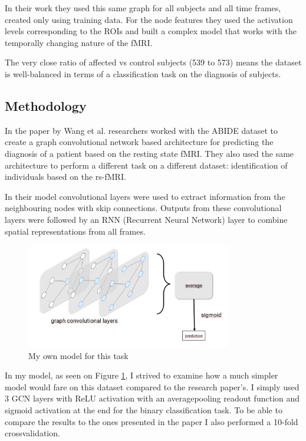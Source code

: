 	In their work they used this same graph for all subjects and all time frames, created only using training data. For the node features they used the activation levels corresponding to the ROIs and built a complex model that works with the temporally changing nature of the fMRI. 
	
	
	The very close ratio of affected vs control subjects (539 to 573) means the dataset is well-balanced in terms of a classification task on the diagnosis of subjects. 
	
	\subsection{Methodology}
	In the paper \cite{wang2021graph} by Wang et al. researchers worked with the ABIDE dataset to create a graph convolutional network based architecture for predicting the diagnosis of a patient based on the resting state fMRI. They also used the same architecture to perform a different task on a different dataset: identification of individuals based on the rs-fMRI.
	
	
	 In their model convolutional layers were used to extract information from the neighbouring nodes with skip connections. Outputs from these convolutional layers were followed by an RNN (Recurrent Neural Network) layer to combine spatial representations from all frames. 
	
	\begin{figure}[!h]
		\centering
		\includegraphics[width=0.8\textwidth]{figures/onlab_abra.png}
		\caption{My own model for this task}
		\label{fig:onlab}
	\end{figure}
	
	In my model, as seen on Figure \ref{fig:onlab}, I strived to examine how a much simpler model would fare on this dataset compared to the research paper's. I simply used 3 GCN layers with ReLU activation with an averagepooling readout function and sigmoid activation at the end for the binary classification task. To be able to compare the results to the ones presented in the paper I also performed a 10-fold crossvalidation.
	
